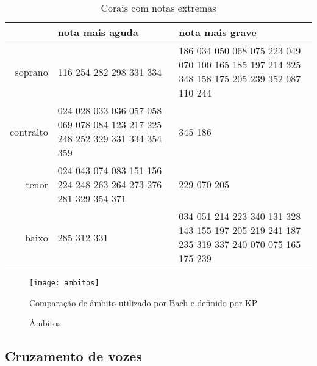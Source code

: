 \begin{table}[t]
\begin{center}
\begin{small}
\begin{sc}
  \begin{tabular}{r|p{4cm}p{4cm}}
    & nota mais aguda & nota mais grave \\ 
    \hline
    soprano &  116 254 282 298 331 334 &  186 034 050 068 075 223 049 070 100 165 185 197 214 325 348 158 175
    205 239 352 087 110 244 \\ \aroundspace
    contralto & 024 028 033 036 057 058 069 078 084 123 217 225 248 252 329 331 334
    354 359 &   345 186 \\ \aroundspace
    tenor &   024 043 074 083 151 156 224 248 263 264 273 276 281 329
    354 371 &   229 070 205 \\ \aroundspace
    baixo &   285 312 331 &   034 051 214 223 340 131 328 143 155 197 205 219 241 187 235 319 337
    240 070 075 165 175 239 
  \end{tabular}
  \caption{Corais com notas extremas}
  \label{tab:notas-extremas}
\end{sc}
\end{small}
\end{center}
\end{table}

\begin{figure}
  \centering
  \texttt{[image: ambitos]}
  \caption{Comparação de âmbito utilizado por Bach e definido por KP}
  \label{fig:ambito-kostka}
\end{figure}

\begin{figure}
  \centering
  \caption{Âmbitos}
  \label{fig:ambitos-alem}
\end{figure}

\subsection{Cruzamento de vozes}
\label{sec:cruzamento-de-vozes}

